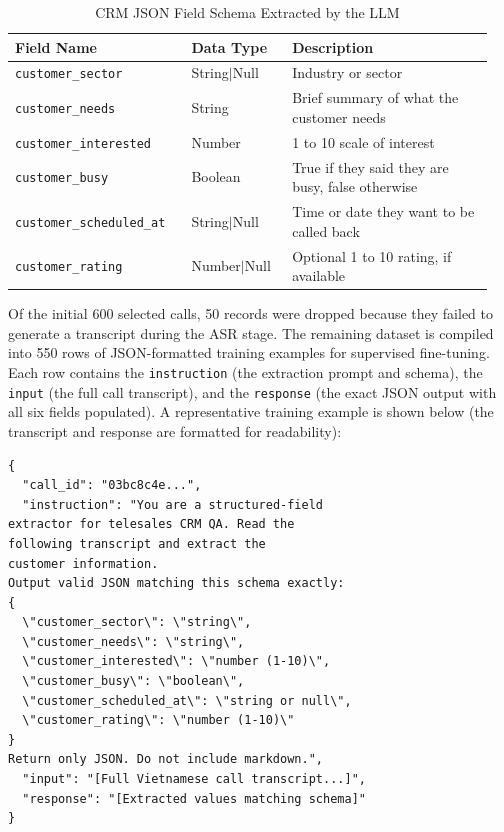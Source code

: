 \documentclass[unnumsec,webpdf,modern,large]{oup-authoring-template}%
\theoremstyle{thmstyleone}%
\theoremstyle{thmstyletwo}%
\theoremstyle{thmstylethree}%
\begin{document}
\begin{table}[hbt!]
  \centering
  \caption{CRM JSON Field Schema Extracted by the LLM}
  \label{tab:crm_fields}
  \begin{tabular}{p{0.35\linewidth} p{0.2\linewidth} p{0.4\linewidth}}
    \toprule
    \textbf{Field Name} & \textbf{Data Type} & \textbf{Description} \\
    \midrule
    \texttt{customer\_sector} & String$|$Null & Industry or sector \\
    \texttt{customer\_needs} & String & Brief summary of what the customer needs \\
    \texttt{customer\_interested} & Number & 1 to 10 scale of interest \\
    \texttt{customer\_busy} & Boolean & True if they said they are busy, false otherwise \\
    \texttt{customer\_scheduled\_at} & String$|$Null & Time or date they want to be called back \\
    \texttt{customer\_rating} & Number$|$Null & Optional 1 to 10 rating, if available \\
    \bottomrule
  \end{tabular}
\end{table}  
 
Of the initial 600 selected calls, 50 records were dropped because they failed to generate a transcript during the ASR stage. The remaining dataset is compiled into 550 rows of JSON-formatted training examples for supervised fine-tuning. Each row contains the \texttt{instruction} (the extraction prompt and schema), the \texttt{input} (the full call transcript), and the \texttt{response} (the exact JSON output with all six fields populated). A representative training example is shown below (the transcript and response are formatted for readability):

\begin{verbatim} 
{
  "call_id": "03bc8c4e...",
  "instruction": "You are a structured-field 
extractor for telesales CRM QA. Read the  
following transcript and extract the  
customer information.   
Output valid JSON matching this schema exactly: 
{
  \"customer_sector\": \"string\",
  \"customer_needs\": \"string\", 
  \"customer_interested\": \"number (1-10)\",
  \"customer_busy\": \"boolean\",
  \"customer_scheduled_at\": \"string or null\",
  \"customer_rating\": \"number (1-10)\"
}
Return only JSON. Do not include markdown.",
  "input": "[Full Vietnamese call transcript...]",
  "response": "[Extracted values matching schema]"
}
\end{verbatim}
\end{document}
